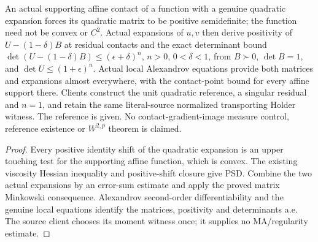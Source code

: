 \begin{lemma}
  \label{lem:convex-contact-determinant}
  \leanok
  An actual supporting affine contact of a function with a genuine quadratic
  expansion forces its quadratic matrix to be positive semidefinite; the function
  need not be convex or $C^2$. Actual expansions of $u,v$ then derive positivity
  of $U-(1-\delta)B$ at residual contacts and the exact determinant bound
  $\det(U-(1-\delta)B)\le(\epsilon+\delta)^n$, $n>0$, $0<\delta<1$,
  from $B\succ0$, $\det B=1$, and $\det U\le(1+\epsilon)^n$.
  Actual local Alexandrov equations provide both matrices and expansions almost
  everywhere, with the contact-point bound for every affine support there.
  Clients construct the unit quadratic reference, a singular residual and $n=1$,
  and retain the same literal-source normalized transporting Holder witness.
  The reference is given. No contact-gradient-image measure control, reference
  existence or $W^{2,p}$ theorem is claimed.
\end{lemma}
\begin{proof}
  \leanok
  Every positive identity shift of the quadratic expansion is an upper touching
  test for the supporting affine function, which is convex. The existing viscosity
  Hessian inequality and positive-shift closure give PSD. Combine the two actual
  expansions by an error-sum estimate and apply the proved matrix Minkowski
  consequence. Alexandrov second-order differentiability and the genuine local
  equations identify the matrices, positivity and determinants a.e. The source
  client chooses its moment witness once; it supplies no MA/regularity estimate.
\end{proof}


